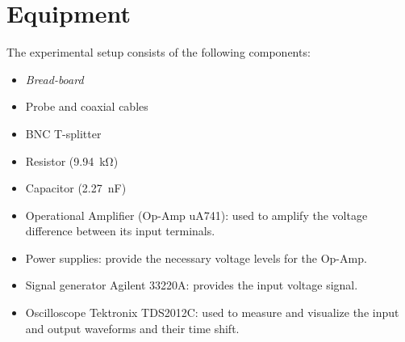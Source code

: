 \section{Equipment}
The experimental setup consists of the following components:

\begin{itemize}
    
    \item \emph{Bread-board}
	\item Probe and coaxial cables
    \item BNC T-splitter
	\item Resistor (\SI{9.94}{\kilo\ohm})
	\item Capacitor (\SI{2.27}{\nano\farad})
    \item Operational Amplifier (Op-Amp uA741): used to amplify the voltage difference between its input terminals.    
    \item Power supplies: provide the necessary voltage levels for the Op-Amp.
    \item Signal generator Agilent 33220A: provides the input voltage signal.
    \item Oscilloscope Tektronix TDS2012C: used to measure and visualize the input and output waveforms and their time shift.

\end{itemize}
